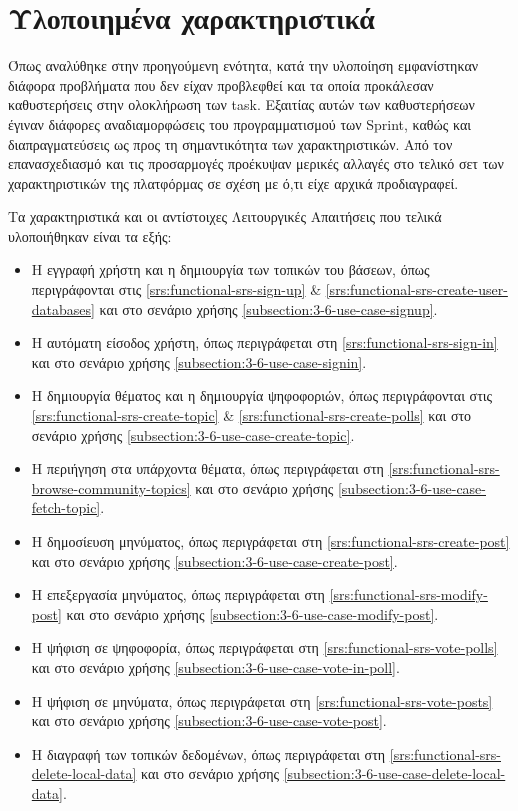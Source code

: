 \section{Υλοποιημένα χαρακτηριστικά} \label{section:4-5-implemented-parts}

Όπως αναλύθηκε στην προηγούμενη ενότητα, κατά την υλοποίηση εμφανίστηκαν διάφορα προβλήματα που δεν είχαν προβλεφθεί και τα οποία προκάλεσαν καθυστερήσεις στην ολοκλήρωση των task. Εξαιτίας αυτών των καθυστερήσεων έγιναν διάφορες αναδιαμορφώσεις του προγραμματισμού των Sprint, καθώς και διαπραγματεύσεις ως προς τη σημαντικότητα των χαρακτηριστικών. Από τον επανασχεδιασμό και τις προσαρμογές προέκυψαν μερικές αλλαγές στο τελικό σετ των χαρακτηριστικών της πλατφόρμας σε σχέση με ό,τι είχε αρχικά προδιαγραφεί.

Τα χαρακτηριστικά και οι αντίστοιχες Λειτουργικές Απαιτήσεις που τελικά υλοποιήθηκαν είναι τα εξής:

\begin{itemize}
    \item Η εγγραφή χρήστη και η δημιουργία των τοπικών του βάσεων, όπως περιγράφονται στις \ref{srs:functional-srs-sign-up} \& \ref{srs:functional-srs-create-user-databases} και στο σενάριο χρήσης \ref{subsection:3-6-use-case-signup}.
    \item Η αυτόματη είσοδος χρήστη, όπως περιγράφεται στη \ref{srs:functional-srs-sign-in} και στο σενάριο χρήσης \ref{subsection:3-6-use-case-signin}.
    \item Η δημιουργία θέματος και η δημιουργία ψηφοφοριών, όπως περιγράφονται στις \ref{srs:functional-srs-create-topic} \& \ref{srs:functional-srs-create-polls} και στο σενάριο χρήσης \ref{subsection:3-6-use-case-create-topic}.
    \item Η περιήγηση στα υπάρχοντα θέματα, όπως περιγράφεται στη \ref{srs:functional-srs-browse-community-topics} και στο σενάριο χρήσης \ref{subsection:3-6-use-case-fetch-topic}.
    \item Η δημοσίευση μηνύματος, όπως περιγράφεται στη \ref{srs:functional-srs-create-post} και στο σενάριο χρήσης \ref{subsection:3-6-use-case-create-post}.
    \item Η επεξεργασία μηνύματος, όπως περιγράφεται στη \ref{srs:functional-srs-modify-post} και στο σενάριο χρήσης \ref{subsection:3-6-use-case-modify-post}.
    \item Η ψήφιση σε ψηφοφορία, όπως περιγράφεται στη \ref{srs:functional-srs-vote-polls} και στο σενάριο χρήσης \ref{subsection:3-6-use-case-vote-in-poll}.
    \item Η ψήφιση σε μηνύματα, όπως περιγράφεται στη \ref{srs:functional-srs-vote-posts} και στο σενάριο χρήσης \ref{subsection:3-6-use-case-vote-post}.
    \item Η διαγραφή των τοπικών δεδομένων, όπως περιγράφεται στη \ref{srs:functional-srs-delete-local-data} και στο σενάριο χρήσης \ref{subsection:3-6-use-case-delete-local-data}.
\end{itemize}

